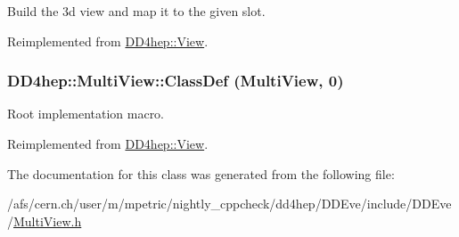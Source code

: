 Build the 3d view and map it to the given slot. 

Reimplemented from \hyperlink{class_d_d4hep_1_1_view_ab4e12874a9cb6a599f268b027443c6ce}{DD4hep::View}.\hypertarget{class_d_d4hep_1_1_multi_view_ae1b4bd4c3527dfe174acada259e6514c}{
\subsubsection[{ClassDef}]{\setlength{\rightskip}{0pt plus 5cm}DD4hep::MultiView::ClassDef ({\bf MultiView}, \/  0)}}
\label{class_d_d4hep_1_1_multi_view_ae1b4bd4c3527dfe174acada259e6514c}


Root implementation macro. 

Reimplemented from \hyperlink{class_d_d4hep_1_1_view_a35dcb8a29c90f0adeba81ad4215be551}{DD4hep::View}.

The documentation for this class was generated from the following file:\begin{DoxyCompactItemize}
\item 
/afs/cern.ch/user/m/mpetric/nightly\_\-cppcheck/dd4hep/DDEve/include/DDEve/\hyperlink{_multi_view_8h}{MultiView.h}\end{DoxyCompactItemize}

